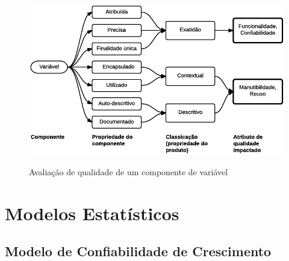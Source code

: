 \documentclass[
	12pt,				%
	openright,			%
	oneside,			%
	a4paper,			%
	english,			%
	brazil,				%
	]{abntex2}
\begin{document}
\begin{figure}[H]
    \centering
    \caption{Avaliação de qualidade de um componente de variável}
    \graphicspath{ {./graphics/} }
    \includegraphics[scale=0.85]{dromey-estrutura_modelo_exemplo-andrei}
    \label{fig:dromey-estrutura_modelo_exemplo}
\end{figure}


\section{Modelos Estatísticos}
\subsection{Modelo de Confiabilidade de Crescimento}
\end{document}
